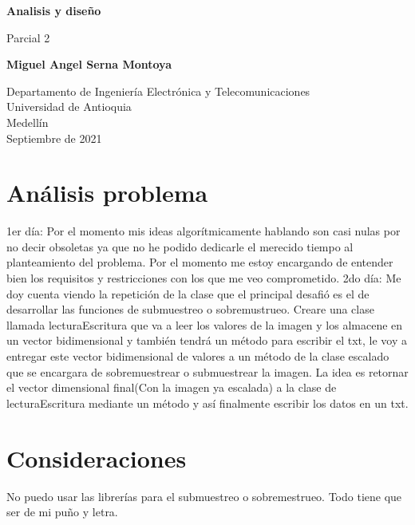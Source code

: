 \documentclass{article}
\begin{document}
\begin{titlepage}
    \begin{center}
        \vspace*{1cm}
            
        \Huge
        \textbf{Analisis y diseño}
            
        \vspace{0.5cm}
        \LARGE
        Parcial 2
            
        \vspace{1.5cm}
        \textbf{Miguel Angel Serna Montoya}
            
        \vfill
            
        \vspace{0.8cm}
            
        \Large
        Departamento de Ingeniería Electrónica y Telecomunicaciones\\
        Universidad de Antioquia\\
        Medellín\\
        Septiembre de 2021
            
    \end{center}
\end{titlepage}

\tableofcontents

\section{Análisis problema} \label{contenido}
1er día: Por el momento mis ideas algorítmicamente hablando son casi nulas por no decir obsoletas ya que no he podido dedicarle el merecido tiempo al planteamiento del problema. Por el momento me estoy encargando de entender bien los requisitos y restricciones con los que me veo comprometido.
2do día: Me doy cuenta viendo la repetición de la clase que el principal desafió es el de desarrollar las funciones de submuestreo o sobremustrueo. Creare una clase llamada lecturaEscritura que va a leer los valores de la imagen y los almacene en un vector bidimensional y también tendrá un método para escribir el txt, le voy a entregar este vector bidimensional de valores a un método de la clase escalado que se encargara de sobremuestrear o submuestrear la imagen. La idea es retornar el vector dimensional final(Con la imagen ya escalada) a la clase de lecturaEscritura mediante un método y así finalmente escribir los datos en un txt.
\section{Consideraciones}
No puedo usar las librerías para el submuestreo o sobremestrueo. Todo tiene que ser de mi puño y letra.
\newpage
\end{document}
